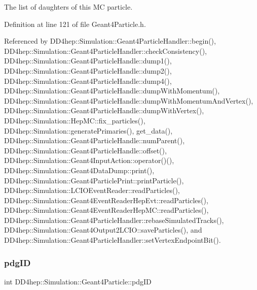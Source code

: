 The list of daughters of this MC particle. 



Definition at line 121 of file Geant4\+Particle.\+h.



Referenced by D\+D4hep\+::\+Simulation\+::\+Geant4\+Particle\+Handler\+::begin(), D\+D4hep\+::\+Simulation\+::\+Geant4\+Particle\+Handler\+::check\+Consistency(), D\+D4hep\+::\+Simulation\+::\+Geant4\+Particle\+Handle\+::dump1(), D\+D4hep\+::\+Simulation\+::\+Geant4\+Particle\+Handle\+::dump2(), D\+D4hep\+::\+Simulation\+::\+Geant4\+Particle\+Handle\+::dump4(), D\+D4hep\+::\+Simulation\+::\+Geant4\+Particle\+Handle\+::dump\+With\+Momentum(), D\+D4hep\+::\+Simulation\+::\+Geant4\+Particle\+Handle\+::dump\+With\+Momentum\+And\+Vertex(), D\+D4hep\+::\+Simulation\+::\+Geant4\+Particle\+Handle\+::dump\+With\+Vertex(), D\+D4hep\+::\+Simulation\+::\+Hep\+M\+C\+::fix\+\_\+particles(), D\+D4hep\+::\+Simulation\+::generate\+Primaries(), get\+\_\+data(), D\+D4hep\+::\+Simulation\+::\+Geant4\+Particle\+Handle\+::num\+Parent(), D\+D4hep\+::\+Simulation\+::\+Geant4\+Particle\+Handle\+::offset(), D\+D4hep\+::\+Simulation\+::\+Geant4\+Input\+Action\+::operator()(), D\+D4hep\+::\+Simulation\+::\+Geant4\+Data\+Dump\+::print(), D\+D4hep\+::\+Simulation\+::\+Geant4\+Particle\+Print\+::print\+Particle(), D\+D4hep\+::\+Simulation\+::\+L\+C\+I\+O\+Event\+Reader\+::read\+Particles(), D\+D4hep\+::\+Simulation\+::\+Geant4\+Event\+Reader\+Hep\+Evt\+::read\+Particles(), D\+D4hep\+::\+Simulation\+::\+Geant4\+Event\+Reader\+Hep\+M\+C\+::read\+Particles(), D\+D4hep\+::\+Simulation\+::\+Geant4\+Particle\+Handler\+::rebase\+Simulated\+Tracks(), D\+D4hep\+::\+Simulation\+::\+Geant4\+Output2\+L\+C\+I\+O\+::save\+Particles(), and D\+D4hep\+::\+Simulation\+::\+Geant4\+Particle\+Handler\+::set\+Vertex\+Endpoint\+Bit().

\hypertarget{class_d_d4hep_1_1_simulation_1_1_geant4_particle_a0af9d9907bce8d40f3bf0207fb6424c3}{}\label{class_d_d4hep_1_1_simulation_1_1_geant4_particle_a0af9d9907bce8d40f3bf0207fb6424c3} 
\subsubsection{\texorpdfstring{pdg\+ID}{pdgID}}
{\footnotesize\ttfamily int D\+D4hep\+::\+Simulation\+::\+Geant4\+Particle\+::pdg\+ID}




